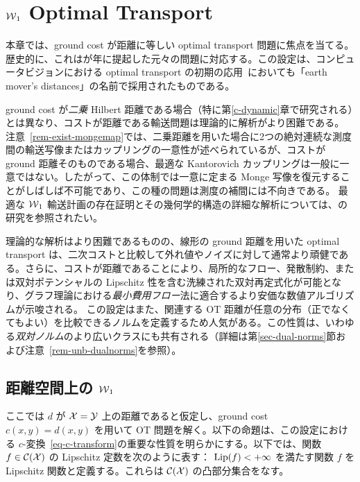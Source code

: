 \chapter{$\operatorname{\mathcal{W}}_1$ Optimal Transport}
\label{c-w1}

本章では、ground cost が距離に等しい optimal transport 問題に焦点を当てる。歴史的に、これは\citeauthor{Monge1781}が\citeyear{Monge1781}年に提起した元々の問題に対応する。この設定は、コンピュータビジョンにおける optimal transport の初期の応用~\citep{RubTomGui00}においても「earth mover's distances」の名前で採用されたものである。

ground cost が\emph{二乗} Hilbert 距離である場合（特に第\ref{c-dynamic}章で研究される）とは異なり、コストが距離である輸送問題は理論的に解析がより困難である。
注意~\ref{rem-exist-mongemap}では、二乗距離を用いた場合に2つの絶対連続な測度間の輸送写像またはカップリングの一意性が述べられているが、コストが ground 距離そのものである場合、最適な Kantorovich カップリングは一般に一意ではない。したがって、この体制では一意に定まる Monge 写像を復元することがしばしば不可能であり、この種の問題は測度の補間には不向きである。
最適な $\operatorname{\mathcal{W}}_1$ 輸送計画の存在証明とその幾何学的構造の詳細な解析については、\citet{trudinger2001monge,caffarelli2002constructing,sudakov1979geometric,evans1999differential}の研究を参照されたい。

理論的な解析はより困難であるものの、線形の ground 距離を用いた optimal transport は、二次コストと比較して外れ値やノイズに対して通常より頑健である。さらに、コストが距離であることにより、局所的なフロー、発散制約、または双対ポテンシャルの Lipschitz 性を含む洗練された双対再定式化が可能となり、グラフ理論における\emph{最小費用フロー}法に適合するより安価な数値アルゴリズムが示唆される。
この設定はまた、関連する OT 距離が任意の分布（正でなくてもよい）を比較できるノルムを定義するため人気がある。この性質は、いわゆる\emph{双対ノルム}のより広いクラスにも共有される（詳細は第\ref{sec-dual-norms}節および注意~\ref{rem-unb-dualnorms}を参照）。

\section{距離空間上の $\operatorname{\mathcal{W}}_1$}
\label{sec-w1-metric}

ここでは $d$ が $\mathcal{X}=\mathcal{Y}$ 上の距離であると仮定し、ground cost $c(x,y)=d(x,y)$ を用いて OT 問題を解く。以下の命題は、この設定における $c$-変換~\eqref{eq-c-transform}の重要な性質を明らかにする。以下では、関数 $f \in \mathcal{C}(\mathcal{X})$ の Lipschitz 定数を次のように表す：
$\operatorname{Lip}(f) < +\infty$ を満たす関数 $f$ を Lipschitz 関数と定義する。これらは $\mathcal{C}(\mathcal{X})$ の凸部分集合をなす。

